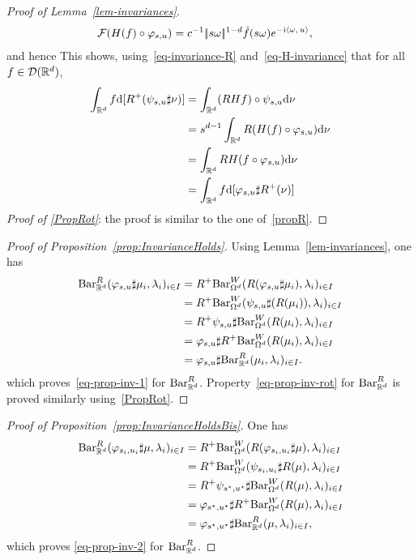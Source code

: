 \begin{proof}[Proof of Lemma~\ref{lem-invariances}]
\begin{align*}
				\mathcal{F}( H(f) \circ \varphi_{s,u} ) &= c^{-1}|\!| s\omega |\!|^{1-d} \hat f(s\omega) e^{-\mathrm{i} \langle \omega,\,u\rangle}, 
			\end{align*}
			and hence
			This shows, using~\eqref{eq-invariance-R} and~\eqref{eq-H-invariance} that for all $f \in \mathcal{D}(\mathbb{R}^d)$, 
			\begin{align*}
				\int_{\mathbb{R}^d} f \mathrm{d}[ R^+( \psi_{s,u} \sharp \nu ) ] 
				&= \int_{\mathbb{R}^d} (RHf) \circ \psi_{s,u}  \mathrm{d} \nu \\ 
				&= s^{d-1} \int_{\mathbb{R}^d} R(H(f)  \circ \varphi_{s,u})  \mathrm{d} \nu \\
				&= \int_{\mathbb{R}^d} RH(f  \circ \varphi_{s,u})  \mathrm{d} \nu \\
				&= \int_{\mathbb{R}^d} f  \mathrm{d}[ \varphi_{s,u} \sharp  R^+(\nu) ] \\
			\end{align*}
		\noindent\textit{Proof of \eqref{PropRot}}: the proof is similar to the one of~\eqref{propR}.
\end{proof}

\begin{proof}[Proof of Proposition~\ref{prop:InvarianceHolds}]
		Using Lemma~\ref{lem-invariances}, one has
		\begin{align*}
		\text{\upshape Bar}_{\mathbb{R}^d}^R(\varphi_{s,u} \sharp \mu_i,\lambda_i)_{i \in I} 
			&= R^+ \text{\upshape Bar}_{\Omega^d}^W(R(\varphi_{s,u}\sharp \mu_i), \lambda_i)_{i \in I}\\
			&= R^+ \text{\upshape Bar}_{\Omega^d}^W(\psi_{s,u}\sharp (R(\mu_i)), \lambda_i)_{i \in I}\\
			&= R^+ \psi_{s,u} \sharp \text{\upshape Bar}_{\Omega^d}^W(R(\mu_i), \lambda_i)_{i \in I}\\
			&= \varphi_{s,u} \sharp R^+ \text{\upshape Bar}_{\Omega^d}^W(R(\mu_i), \lambda_i)_{i \in I}\\
			&= \varphi_{s,u} \sharp \text{\upshape Bar}_{\mathbb{R}^d}^R(\mu_i,\lambda_i)_{i \in I}.
		\end{align*}
		which proves~\eqref{eq-prop-inv-1} for $\text{\upshape Bar}_{\mathbb{R}^d}^R$.
		Property~\eqref{eq-prop-inv-rot} for $\text{\upshape Bar}_{\mathbb{R}^d}^R$ is proved similarly using~\eqref{PropRot}.
\end{proof}


		
\begin{proof}[Proof of Proposition~\ref{prop:InvarianceHoldsBis}]
		One has
		\begin{align*}
		\Bary{\RR^d}^R(\phi_{s_i,u_i} \sharp \mu,\la_i)_{i \in I} 
			&= R^+ \Bary{\Om^d}^W(R(\phi_{s_i,u_i}\sharp \mu), \la_i)_{i \in I}\\
			&= R^+ \Bary{\Om^d}^W( \psi_{s_i,u_i}\sharp R(\mu), \la_i)_{i \in I}\\
			&= R^+  \psi_{s^\star,u^\star} \sharp \Bary{\Om^d}^W(R(\mu), \la_i)_{i \in I}\\
			&= \phi_{s^\star,u^\star} \sharp R^+ \Bary{\Om^d}^W(R(\mu), \la_i)_{i \in I}\\
			&= \phi_{s^\star,u^\star} \sharp \Bary{\RR^d}^R(\mu,\la_i)_{i \in I}, %
		\end{align*}
		which proves \eqref{eq-prop-inv-2} for $\text{\upshape Bar}_{\mathbb{R}^d}^R$.
\end{proof}

